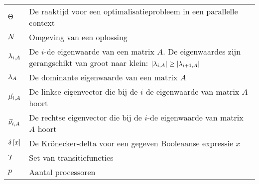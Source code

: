 \begin{flushleft}
\begin{tabularx}{\textwidth}{@{}p{18mm}X@{}}
    $\phittime$					& De raaktijd voor een optimalisatieprobleem in een parallelle context\\
    $\neighbr$					& Omgeving van een oplossing\\
    $\ev[i,A]$					& De $i$-de eigenwaarde van een matrix $A$. De eigenwaardes zijn gerangschikt van groot naar klein: $\abs{\ev[i,A]}\geq\abs{\ev[i+1,A]}$\\
    $\ev[A]$					& De dominante eigenwaarde van een matrix $A$\\
    $\evl[i,A]$					& De linkse eigenvector die bij de $i$-de eigenwaarde van matrix $A$ hoort\\
    $\evr[i,A]$					& De rechtse eigenvector die bij de $i$-de eigenwaarde van matrix $A$ hoort\\
    $\krdelta{x}$				& De Kr\"onecker-delta voor een gegeven Booleaanse expressie $x$\\
    $\TranSet$					& Set van transitiefuncties\\
    $p$							& Aantal processoren\\
  \end{tabularx}
\end{flushleft}
